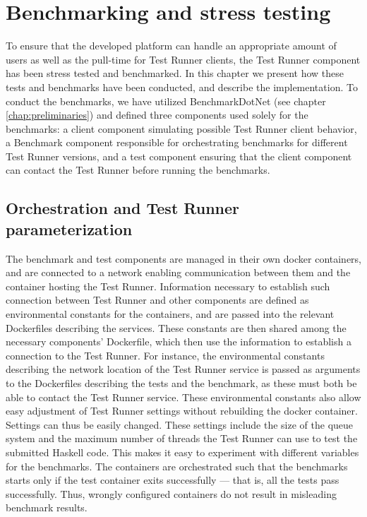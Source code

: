 \chapter{Benchmarking and stress testing} \label{chap:Benchmarking}
To ensure that the developed platform can handle an appropriate amount of users as well as the pull-time for Test Runner clients, the Test Runner component has been stress tested and benchmarked.
In this chapter we present how these tests and benchmarks have been conducted, and describe the implementation. To conduct the benchmarks, we have utilized BenchmarkDotNet (see chapter \ref{chap:preliminaries}) and defined three components used solely for the benchmarks:
a client component simulating possible Test Runner client behavior, a Benchmark component responsible for orchestrating benchmarks for different Test Runner versions, and a test component ensuring that the client component can contact the Test Runner before running the benchmarks.

\section{Orchestration and Test Runner parameterization}
The benchmark and test components are managed in their own docker containers, and are connected to a network enabling communication between them and the container hosting the Test Runner. 
Information necessary to establish such connection between Test Runner and other components are defined as environmental constants for the containers, and are passed into the relevant Dockerfiles describing the services.
These constants are then shared among the necessary components' Dockerfile, which then use the information to establish a connection to the Test Runner.
For instance, the environmental constants describing the network location of the Test Runner service is passed as arguments to the Dockerfiles describing the tests and the benchmark, as these must both be able to contact the Test Runner service.
These environmental constants also allow easy adjustment of Test Runner settings without rebuilding the docker container.
Settings can thus be easily changed.
These settings include the size of the queue system and the maximum number of threads the Test Runner can use to test the submitted Haskell code.
This makes it easy to experiment with different variables for the benchmarks.  
The containers are orchestrated such that the benchmarks starts only if the test container exits successfully --- that is, all the tests pass successfully. 
Thus, wrongly configured containers do not result in misleading benchmark results.

